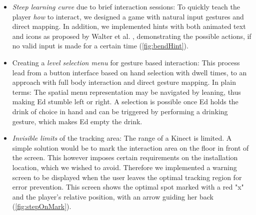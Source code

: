 \documentclass{chi-ext}
\begin{document}
\begin{itemize}
	\item \textit{Steep learning curve} due to brief interaction sessions: To quickly teach the player \textit{how} to interact, we designed a game with natural input gestures and direct mapping. In addition, we implemented hints with both animated text and icons as proposed by Walter et al. \cite{walter2013strikeapose}, demonstrating the possible actions, if no valid input is made for a certain time (\autoref{fig:bendHint}).
\item Creating a \textit{level selection menu} for gesture based interaction: This process lead from a button interface based on hand selection with dwell times, to an approach with full body interaction and direct gesture mapping. In plain terms: The spatial menu representation may be navigated by leaning, thus making Ed stumble left or right. A selection is possible once Ed holds the drink of choice in hand and can be triggered by performing a drinking gesture, which makes Ed empty the drink.
\item \textit{Invisible limits} of the tracking area: The range of a Kinect is limited. A simple solution would be to mark the interaction area on the floor in front of the screen. This however imposes certain requirements on the installation location, which we wished to avoid. Therefore we implemented a warning screen to be displayed when the user leaves the optimal tracking region for error prevention. This screen shows the optimal spot marked with a red "x" and the player's relative position, with an arrow guiding her back (\autoref{fig:stepOnMark}).
\end{itemize}

\end{document}
